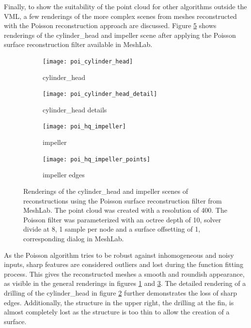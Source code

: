 Finally, to show the suitability of the point cloud for other algorithms outside the VML, a few renderings of the more complex scenes from meshes reconstructed with the Poisson reconstruction approach are discussed.
Figure \ref{fig:poisson_results} shows renderings of the cylinder\_head and impeller scene after applying the Poisson surface reconstruction filter available in MeshLab.
%
\begin{figure}
	\centering
	\begin{subfigure}[b]{0.49\textwidth}
		\centering
		\texttt{[image: poi\_cylinder\_head]}
		\caption{cylinder\_head}
		\label{fig:poi_cylinder_head}
	\end{subfigure}
	\begin{subfigure}[b]{0.49\textwidth}
		\centering
		\texttt{[image: poi\_cylinder\_head\_detail]}
		\caption{cylinder\_head details}
		\label{fig:poi_cylinder_head_detail}
	\end{subfigure}
	\begin{subfigure}[b]{0.49\textwidth}
		\centering
		\texttt{[image: poi\_hq\_impeller]}
		\caption{impeller}
		\label{fig:poi_hq_impeller}
	\end{subfigure}
	\begin{subfigure}[b]{0.49\textwidth}
		\centering
		\texttt{[image: poi\_hq\_impeller\_points]}
		\caption{impeller edges}
		\label{fig:poi_hq_impeller_points}
	\end{subfigure}
	\caption{
		Renderings of the cylinder\_head and impeller scenes of reconstructions using the Poisson surface reconstruction filter from MeshLab.
		The point cloud was created with a resolution of 400.
		The Poisson filter was parameterized with an octree depth of 10, solver divide at 8, 1 sample per node and a surface offsetting of 1, \cf corresponding dialog in MeshLab.
	}
	\label{fig:poisson_results}
\end{figure}
%
As the Poisson algorithm tries to be robust against inhomogeneous and noisy inputs, sharp features are considered outliers and lost during the function fitting process.
This gives the reconstructed meshes a smooth and roundish appearance, as visible in the general renderings in figures \ref{fig:poi_cylinder_head} and \ref{fig:poi_hq_impeller}.
The detailed rendering of a drilling of the cylinder\_head in figure \ref{fig:poi_cylinder_head_detail} further demonstrates the loss of sharp edges.
Additionally, the structure in the upper right, the drilling at the fin, is almost completely lost as the structure is too thin to allow the creation of a surface.

